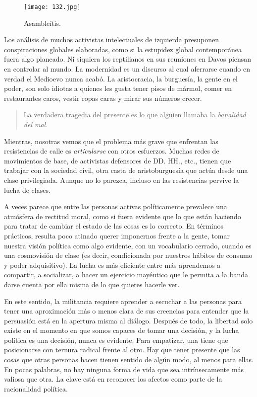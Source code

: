\begin{figure}[htbp]
	\centering
	\texttt{[image: 132.jpg]}
	\caption{Asambleítis.}
	\label{fig:132}
\end{figure}

Los análisis de muchos activistas intelectuales de izquierda presuponen conspiraciones globales elaboradas, como si la estupidez global contemporánea fuera algo planeado. Ni siquiera los reptilianos en sus reuniones en Davos piensan en controlar al mundo. La modernidad es un discurso al cual aferrarse cuando en verdad el Medioevo nunca acabó. La aristocracia, la burguesía, la gente en el poder, son solo idiotas a quienes les gusta tener pisos de mármol, comer en restaurantes caros, vestir ropas caras y mirar sus números crecer.

\begin{quote}
	La verdadera tragedia del presente es lo que alguien llamaba la \emph{banalidad del mal}.\addref{}
\end{quote}

Mientras, nosotras vemos que el problema más grave que enfrentan las resistencias de calle es \emph{articularse} con otros esfuerzos. Muchas redes de movimientos de base, de activistas defensores de DD. HH., etc., tienen que trabajar con la sociedad civil, otra casta de aristoburguesía que actúa desde una clase privilegiada. Aunque no lo parezca, incluso en las resistencias pervive la lucha de clases.

A veces parece que entre las personas activas políticamente prevalece una atmósfera de rectitud moral, como si fuera evidente que lo que están haciendo para tratar de cambiar el estado de las cosas es lo correcto. En términos prácticos, resulta poco atinado querer imponernos frente a la gente, tomar nuestra visión política como algo evidente, con un vocabulario cerrado, cuando es una cosmovisión de clase (es decir, condicionada por nuestros hábitos de consumo y poder adquisitivo). La lucha es más eficiente entre más aprendemos a compartir, a socializar, a hacer un ejercicio mayéutico que le permita a la banda darse cuenta por ella misma de lo que quieres hacerle ver.

En este sentido, la militancia requiere aprender a escuchar a las personas para tener una aproximación más o menos clara de sus creencias para entender que la persuasión está en la apertura misma al diálogo. Después de todo, la libertad solo existe en el momento en que somos capaces de tomar una decisión, y la lucha política es una decisión, nunca es evidente. Para empatizar, una tiene que posicionarse con ternura radical frente al otro. Hay que tener presente que las cosas que otras personas hacen tienen sentido de algún modo, al menos para ellas. En pocas palabras, no hay ninguna forma de vida que sea intrínsecamente más valiosa que otra. La clave está en reconocer los afectos como parte de la racionalidad política.

